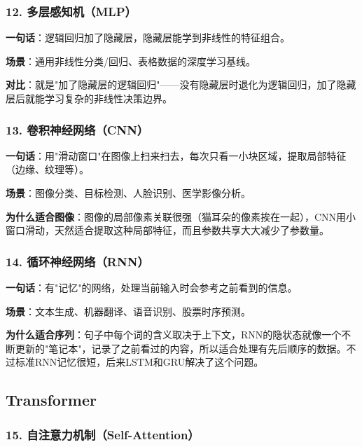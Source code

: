 \documentclass[12pt,a4paper]{ctexart}
\begin{document}
\subsubsection{12. 多层感知机（MLP）}

\begin{funbox}[MLP]
\textbf{一句话}：逻辑回归加了隐藏层，隐藏层能学到非线性的特征组合。

\textbf{场景}：通用非线性分类/回归、表格数据的深度学习基线。

\textbf{对比}：就是"加了隐藏层的逻辑回归"——没有隐藏层时退化为逻辑回归，加了隐藏层后就能学习复杂的非线性决策边界。
\end{funbox}

\subsubsection{13. 卷积神经网络（CNN）}

\begin{funbox}[CNN]
\textbf{一句话}：用"滑动窗口"在图像上扫来扫去，每次只看一小块区域，提取局部特征（边缘、纹理等）。

\textbf{场景}：图像分类、目标检测、人脸识别、医学影像分析。

\textbf{为什么适合图像}：图像的局部像素关联很强（猫耳朵的像素挨在一起），CNN用小窗口滑动，天然适合提取这种局部特征，而且参数共享大大减少了参数量。
\end{funbox}

\subsubsection{14. 循环神经网络（RNN）}

\begin{funbox}[RNN]
\textbf{一句话}：有"记忆"的网络，处理当前输入时会参考之前看到的信息。

\textbf{场景}：文本生成、机器翻译、语音识别、股票时序预测。

\textbf{为什么适合序列}：句子中每个词的含义取决于上下文，RNN的隐状态就像一个不断更新的"笔记本"，记录了之前看过的内容，所以适合处理有先后顺序的数据。不过标准RNN记忆很短，后来LSTM和GRU解决了这个问题。
\end{funbox}

\subsection{Transformer}

\subsubsection{15. 自注意力机制（Self-Attention）}
\end{document}
